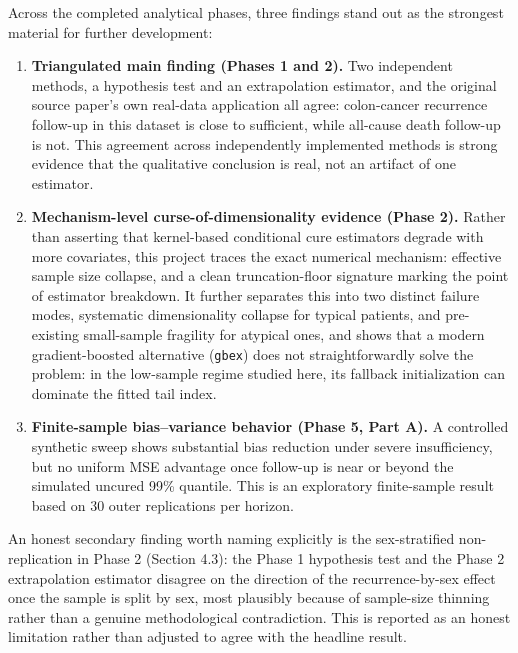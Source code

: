 \documentclass[11pt]{article}
\begin{document}
Across the completed analytical phases, three findings stand out as the strongest
material for further development:

\begin{enumerate}[nosep]
    \item \textbf{Triangulated main finding (Phases 1 and 2).} Two independent
    methods, a hypothesis test and an extrapolation estimator, and the original
    source paper's own real-data application all agree: colon-cancer recurrence
    follow-up in this dataset is close to sufficient, while all-cause death
    follow-up is not. This agreement across independently implemented methods is
    strong evidence that the qualitative conclusion is real, not an artifact of one
    estimator.

    \item \textbf{Mechanism-level curse-of-dimensionality evidence (Phase 2).} Rather
    than asserting that kernel-based conditional cure estimators degrade with more
    covariates, this project traces the exact numerical mechanism: effective sample
    size collapse, and a clean truncation-floor signature marking the point of
    estimator breakdown. It further separates this into two distinct failure
    modes, systematic dimensionality collapse for typical patients, and
    pre-existing small-sample fragility for atypical ones, and shows that a
    modern gradient-boosted alternative (\texttt{gbex}) does not straightforwardly
    solve the problem: in the low-sample regime studied here, its fallback
    initialization can dominate the fitted tail index.

    \item \textbf{Finite-sample bias--variance behavior (Phase 5, Part A).} A controlled
    synthetic sweep shows substantial bias reduction under severe insufficiency, but
    no uniform MSE advantage once follow-up is near or beyond the simulated uncured
    99\% quantile. This is an exploratory finite-sample result based on 30 outer
    replications per horizon.
\end{enumerate}

An honest secondary finding worth naming explicitly is the sex-stratified
non-replication in Phase 2 (Section 4.3): the Phase 1 hypothesis test and the
Phase 2 extrapolation estimator disagree on the direction of the recurrence-by-sex
effect once the sample is split by sex, most plausibly because of sample-size
thinning rather than a genuine methodological contradiction. This is reported as
an honest limitation rather than adjusted to agree with the headline result.
\end{document}
